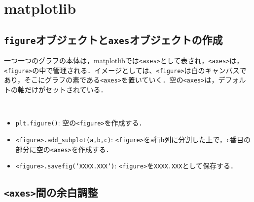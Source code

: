 \section{matplotlib}

\subsection{\texttt{figure}オブジェクトと\texttt{axes}オブジェクトの作成}
一つ一つのグラフの本体は，matplotlibでは\texttt{<axes>}として表され，\texttt{<axes>}は，\texttt{<figure>}の中で管理される．イメージとしては、\texttt{<figure>}は白のキャンバスであり，そこにグラフの素である\texttt{<axes>}を置いていく．空の\texttt{<axes>}は，デフォルトの軸だけがセットされている．

\begin{gram}　
\begin{itemize}
\item \texttt{plt.figure()}: 空の\texttt{<figure>}を作成する．
\item \texttt{<figure>.add\_subplot(a,b,c)}: \texttt{<figure>}を\texttt{a}行\texttt{b}列に分割した上で，\texttt{c}番目の部分に空の\texttt{<axes>}を作成する．
\item \texttt{<figure>.savefig('XXXX.XXX')}: \texttt{<figure>}を\texttt{XXXX.XXX}として保存する．
\end{itemize}
\end{gram}

\begin{cod}[\texttt{fig1.py}]　
}]{code/fig1.py}
\vspace{-19pt}
\begin{figure}[H]
\begin{center}
\framed
\texttt{[image: code/fig1.eps]}
\vspace{-16pt}
\caption{\texttt{fig1.eps}}
\endframed
\end{center}
\end{figure}
\end{cod}
\vspace{-20pt}

\subsection{\texttt{<axes>}間の余白調整}

